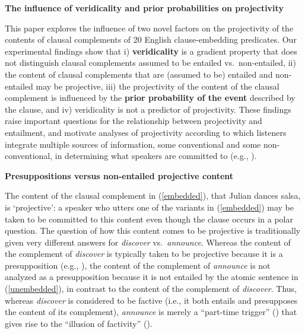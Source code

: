 \documentclass[12pt,fleqn]{article}
\newcommand{\6}{\mbox{$[\hspace*{-.6mm}[$}}
\newcommand{\9}{\mbox{$]\hspace*{-.6mm}]$}}
\begin{document}
 
 
\begin{center}
{\large \bf The influence of veridicality and prior probabilities on projectivity}
\end{center}

This paper explores the influence of two novel factors on the projectivity of the contents of clausal complements of 20 English clause-embedding predicates. Our experimental findings show that i) {\bf veridicality} is a gradient property that does not distinguish clausal complements assumed to be entailed vs.\ non-entailed, ii) the content of clausal complements that are (assumed to be) entailed and non-entailed may be projective, iii) the projectivity of the content of the clausal complement is influenced by the {\bf prior probability of the event} described by the clause, and iv) veridicality is not a predictor of projectivity. These findings raise important questions for the relationship between projectivity and entailment, and motivate analyses of projectivity according to which listeners integrate multiple sources of information, some conventional and some non-conventional, in determining what speakers are committed to (e.g., \citealt{abrusan2011,abrusan2016,brst-ar}). 

{\bf Presuppositions versus non-entailed projective content} 

The content of the clausal complement in (\ref{embedded}), that Julian dances salsa, is `projective': a speaker who utters one of the variants in (\ref{embedded}) may be taken to be committed to this content even though the clause occurs in a polar question. The question of how this content comes to be projective is traditionally given very different answers for {\em discover} vs.\ {\em announce}. Whereas the content of the complement of {\em discover} is typically taken to be projective because it is a presupposition (e.g., \citealt{heim83,vds92}), the content of the complement of {\em announce} is not analyzed as a presupposition because it is not entailed by the atomic sentence in (\ref{unembedded}), in contrast to the content of the complement of {\em discover}. Thus, whereas {\em discover} is considered to be factive (i.e., it both entails and presupposes the content of its complement), {\em announce} is merely a ``part-time trigger'' (\citealt[139]{schlenker10}) that gives rise to the ``illusion of factivity'' (\citealt[76]{anand-hacquard2014}). 
\end{document}

